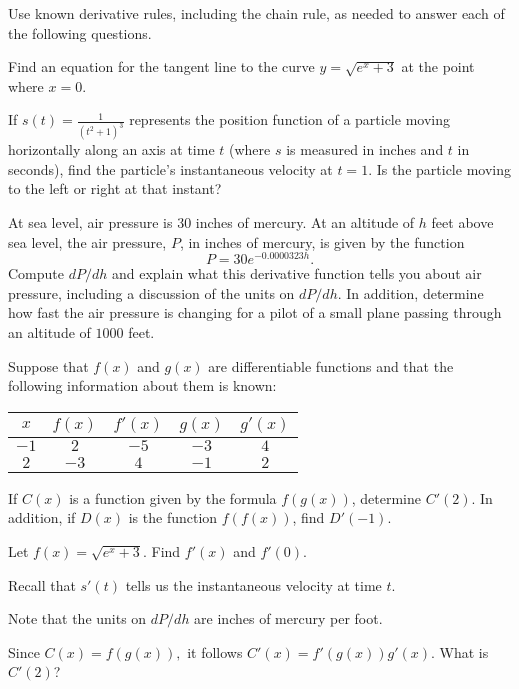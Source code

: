 \begin{activity} \label{A:2.5.3}   Use known derivative rules, including the chain rule, as needed to answer each of the following questions.
\ba
	\item Find an equation for the tangent line to the curve $y= \sqrt{e^x + 3}$ at the point where $x=0$.

  	\item If $\displaystyle s(t) = \frac{1}{(t^2+1)^3}$ represents the position function of a particle moving horizontally along an axis at time $t$ (where $s$ is measured in inches and $t$ in seconds), find the particle's instantaneous velocity at $t=1$.  Is the particle moving to the left or right at that instant?

  	\item At sea level, air pressure is 30 inches of mercury.  At an altitude of $h$ feet above sea level, the air pressure, $P$, in inches of mercury, is given by the function
$$P = 30 e^{-0.0000323 h}.$$
Compute $dP/dh$ and explain what this derivative function tells you about air pressure, including a discussion of the units on $dP/dh$.  In addition, determine how fast the air pressure is changing for a pilot of a small plane passing through an altitude of $1000$ feet.
  	
	\item Suppose that $f(x)$ and $g(x)$ are differentiable functions and that the following information about them is known:
	
\begin{center}
\begin{tabular}{ | c | c | c | c | c | }
   \hline 
   $x$ 	& $f(x)$  	& $f'(x)$	& $g(x)$	& $g'(x)$ \\  \hline

   $-1$ 	& $2$	& $-5$ & $-3$ &  $4$ \\ \hline

   $2$ 	& $-3$	& $4$ & $-1$ &  $2$ \\ \hline
\end{tabular}
\end{center}

If $C(x)$ is a function given by the formula $f(g(x))$, determine $C'(2)$.   In addition, if $D(x)$ is the function $f(f(x))$, find $D'(-1)$. 
\ea
\end{activity}
\begin{smallhint}
\ba
	\item Let $f(x) = \sqrt{e^x + 3}.$ Find $f'(x)$ and $f'(0)$.
  	\item Recall that $s'(t)$ tells us the instantaneous velocity at time $t$.
  	\item Note that the units on $dP/dh$ are inches of mercury per foot.
  	\item Since $C(x) = f(g(x)),$ it follows $C'(x) = f'(g(x))g'(x).$  What is $C'(2)$?
\ea
\end{smallhint}
